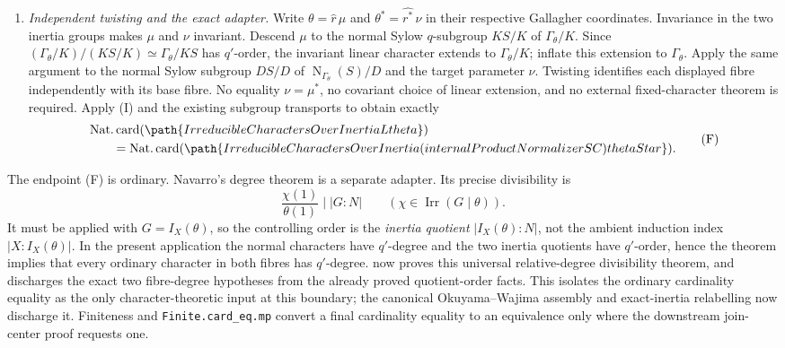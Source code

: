 \documentclass[11pt]{article}
\newcommand{\Irr}{\operatorname{Irr}}
\newcommand{\Norm}{\operatorname{N}}
\begin{document}
\begin{enumerate}[label=\textbf{O\arabic*.},leftmargin=*]
  \item \emph{Independent twisting and the exact adapter.}
  Write
  \(\theta=\widehat r\,\mu\) and
  \(\theta^*=\widehat{r^*}\,\nu\) in their respective Gallagher
  coordinates.  Invariance in the two inertia groups makes \(\mu\) and
  \(\nu\) invariant.  Descend \(\mu\) to the normal Sylow \(q\)-subgroup
  \(KS/K\) of \(\Gamma_\theta/K\).  Since
  \((\Gamma_\theta/K)/(KS/K)\simeq\Gamma_\theta/KS\) has \(q'\)-order,
  the invariant linear character extends to \(\Gamma_\theta/K\); inflate
  this extension to \(\Gamma_\theta\).  Apply the same argument to the
  normal Sylow subgroup
  \(DS/D\) of \(\Norm_{\Gamma_\theta}(S)/D\) and the target parameter
  \(\nu\).
  Twisting identifies each displayed fibre independently with its base fibre.
  No equality \(\nu=\mu^*\), no covariant choice of linear extension, and
  no external fixed-character theorem is required.  Apply (I) and the
  existing subgroup transports to obtain exactly
  \[
  \begin{split}
  &\operatorname{Nat.card}
    (\path{IrreducibleCharactersOverInertia L theta})\\
  &\qquad =
    \operatorname{Nat.card}
    (\path{IrreducibleCharactersOverInertia
      (internalProductNormalizer S C) thetaStar}).
  \end{split}
  \tag{F}
  \]
\end{enumerate}

The endpoint (F) is ordinary.  Navarro's degree theorem
\cite[Theorem~5.12]{Navarro2018} is a separate adapter.  Its precise
divisibility is
\[
  \frac{\chi(1)}{\theta(1)}\mid |G:N|
  \qquad(\chi\in\Irr(G\mid\theta)).
\]
It must be applied with \(G=I_X(\theta)\), so the controlling order is the
\emph{inertia quotient} \(|I_X(\theta):N|\), not the ambient induction
index \(|X:I_X(\theta)|\).  In the present application the normal
characters have \(q'\)-degree and the two inertia quotients have
\(q'\)-order, hence the theorem implies that every ordinary character in
both fibres has \(q'\)-degree.
 now proves this
universal relative-degree divisibility theorem, and
 discharges
the exact two fibre-degree hypotheses from the already proved
quotient-order facts.  This isolates the ordinary cardinality equality as
the only character-theoretic input at this boundary; the canonical
Okuyama--Wajima assembly and exact-inertia relabelling now discharge it.
Finiteness and
\texttt{Finite.card\_eq.mp} convert a final cardinality equality to an
equivalence only where the downstream join-center proof requests one.
\end{document}
